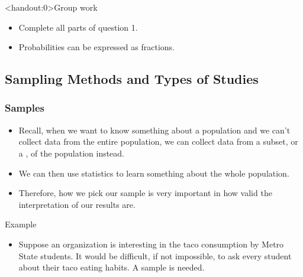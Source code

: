 \documentclass[xcolor=table, aspectratio=169, bigger, handout]{beamer}
\begin{document}
\begin{frame}<handout:0>{Group work}
\begin{block}{}
\begin{itemize}
\item Complete all parts of question 1.
\item Probabilities can be expressed as fractions.
\end{itemize}
\end{block}
\end{frame}

\subsection{Sampling Methods and Types of Studies}

\begin{frame}
\frametitle{Samples}

\begin{block}{}
\begin{itemize}
\item Recall, when we want to know something about a population and we can't collect data from the entire population, we can collect data from a subset, or a , of the population instead.
\pause
\item We can then use statistics to learn something about the whole population.
\pause
\item Therefore, how we pick our sample is very important in how valid the interpretation of our results are.
\end{itemize}
\end{block}
\pause
\begin{exampleblock}{Example}
\begin{itemize}
\item Suppose an organization is interesting in the taco consumption by Metro State students. It would be difficult, if not impossible, to ask every student about their taco eating habits. A sample is needed.
\end{itemize}
\end{exampleblock}
\end{frame}
\end{document}
